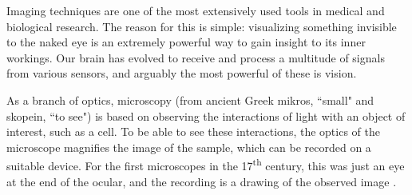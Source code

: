 













% 


Imaging techniques
are one of the most extensively used tools
in medical and biological research. The reason for this is simple: visualizing something invisible to the naked eye is an extremely powerful way to gain insight to its inner workings. Our brain has evolved to receive and process a multitude of signals from various sensors, and arguably the most powerful of these is vision.

As a branch of optics, microscopy (from ancient Greek mikros, ``small" and skopein, ``to see") is based on observing the interactions of light with an object of interest, such as a cell. To be able to see these interactions, the optics of the microscope magnifies the image of the sample, which can be recorded on a suitable device. For the first microscopes in the 17\textsuperscript{th} century, this was just an eye at the end of the ocular, and the recording is a drawing of the observed image \cite{hooke_micrographia:_1665}.

